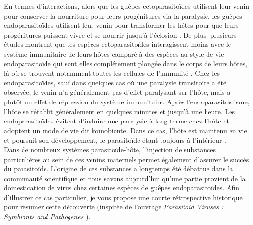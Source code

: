 En termes d'interactions, alors que les guêpes ectoparasitoïdes utilisent leur venin pour conserver la nourriture pour leurs progénitures via la paralysie, les guêpes endoparasitoïdes utilisent leur venin pour transformer les hôtes pour que leurs progénitures puissent vivre et se nourrir jusqu'à l'éclosion \citep{moreau_chapter_2009,schendel_diversity_2019}. De plus, plusieurs études montrent que les espèces ectoparasitoïdes interagissent moins avec le système immunitaire de leurs hôtes comparé à des espèces au style de vie endoparasitoïde qui sont elles complétement plongée dans le corps de leurs hôtes, là où se trouvent notamment toutes les cellules de l'immunité \citep{li_parasitism_2018}. Chez les endoparasitoïdes, sauf dans quelques cas où une paralysie transitoire a été observée, le venin n'a généralement pas d'effet paralysant sur l'hôte, mais a  plutôt un effet de répression du système immunitaire. Après l'endoparasitoïdisme, l'hôte se rétablit généralement en quelques minutes et jusqu'à une heure. Les endoparasitoïdes évitent d'induire une paralysie à long terme chez l'hôte et adoptent un mode de vie dit koïnobionte. Dans ce cas, l'hôte est maintenu en vie et poursuit son développement, le parasitoïde étant toujours à l'intérieur \citep{moreau_venom_2015}.\\

Dans de nombreux systèmes parasitoïde-hôte, l'injection de substances particulières au sein de ces venins maternels permet également d'assurer le succès du parasitoïde. L'origine de ces substances a longtemps été débattue dans la communauté scientifique et nous savons aujourd'hui qu'une partie provient de la domestication de virus chez certaines espèces de guêpes endoparasitoïdes. Afin d'illustrer ce cas particulier, je vous propose une courte rétrospective historique pour résumer cette découverte (inspirée de l'ouvrage \textit{Parasitoid Viruses : Symbionts and Pathogenes} \citep{strand_polydnavirus_2012}).\\

